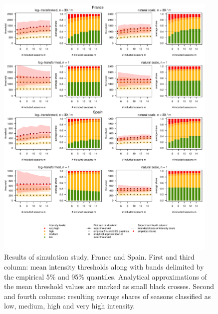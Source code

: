 \documentclass{article}
\begin{document}
\begin{figure}
\centering
\includegraphics[page=1, width=0.95\textwidth]{figure/plot_results.pdf}
\caption{Results of simulation study, France and Spain. First and third column: mean intensity thresholds along with bands delimited by the empirical 5\% and 95\% quantiles. Analytical approximations of the mean threshold values are marked as small black crosses. Second and fourth columns: resulting average shares of seasons classified as low, medium, high and very high intensity.}
\label{fig:results1}
\end{figure}
\end{document}
